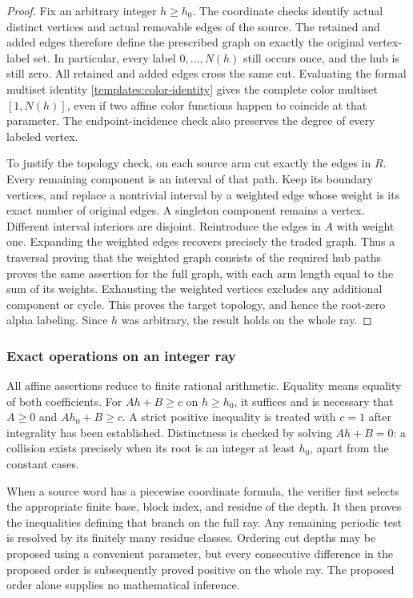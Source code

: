 \begin{proof}
Fix an arbitrary integer $h\ge h_0$.  The coordinate checks identify
actual distinct vertices and actual removable edges of the source.
The retained and added edges therefore define the prescribed graph
on exactly the original vertex-label set.  In particular, every label
$0,\ldots,N(h)$ still occurs once, and the hub is still zero.
All retained and added edges cross the same cut.  Evaluating the
formal multiset identity \eqref{templates:color-identity} gives the
complete color multiset $[1,N(h)]$, even if two affine color functions
happen to coincide at that parameter.  The endpoint-incidence check
also preserves the degree of every labeled vertex.

To justify the topology check, on each source arm cut exactly the
edges in $R$.  Every remaining component is an interval of that path.
Keep its boundary vertices, and replace a nontrivial interval by a
weighted edge whose weight is its exact number of original edges.
A singleton component remains a vertex.  Different interval interiors
are disjoint.  Reintroduce the edges in $A$ with weight one.  Expanding
the weighted edges recovers precisely the traded graph.  Thus a
traversal proving that the weighted graph consists of the required
hub paths proves the same assertion for the full graph, with each
arm length equal to the sum of its weights.  Exhausting the weighted
vertices excludes any additional component or cycle.  This proves the
target topology, and hence the root-zero alpha labeling.  Since $h$
was arbitrary, the result holds on the whole ray.
\end{proof}

\subsubsection{Exact operations on an integer ray}

All affine assertions reduce to finite rational arithmetic.  Equality
means equality of both coefficients.  For $Ah+B\ge c$ on
$h\ge h_0$, it suffices and is necessary that $A\ge0$ and
$Ah_0+B\ge c$.  A strict positive inequality is treated with $c=1$
after integrality has been established.  Distinctness is checked by
solving $Ah+B=0$: a collision exists precisely when its root is an
integer at least $h_0$, apart from the constant cases.

When a source word has a piecewise coordinate formula, the verifier
first selects the appropriate finite base, block index, and residue
of the depth.  It then proves the inequalities defining that branch
on the full ray.  Any remaining periodic test is resolved by its
finitely many residue classes.  Ordering cut depths may be proposed
using a convenient parameter, but every consecutive difference in
the proposed order is subsequently proved positive on the whole
ray.  The proposed order alone supplies no mathematical inference.

